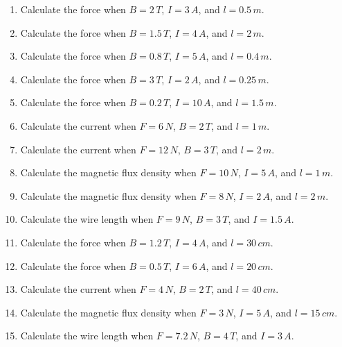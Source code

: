 \documentclass[12pt]{article}
\begin{document}
\begin{enumerate}
    \item Calculate the force when \(B = 2\,T\), \(I = 3\,A\), and \(l = 0.5\,m\).

    \item Calculate the force when \(B = 1.5\,T\), \(I = 4\,A\), and \(l = 2\,m\).

    \item Calculate the force when \(B = 0.8\,T\), \(I = 5\,A\), and \(l = 0.4\,m\).

    \item Calculate the force when \(B = 3\,T\), \(I = 2\,A\), and \(l = 0.25\,m\).

    \item Calculate the force when \(B = 0.2\,T\), \(I = 10\,A\), and \(l = 1.5\,m\).

    \item Calculate the current when \(F = 6\,N\), \(B = 2\,T\), and \(l = 1\,m\).

    \item Calculate the current when \(F = 12\,N\), \(B = 3\,T\), and \(l = 2\,m\).

    \item Calculate the magnetic flux density when \(F = 10\,N\), \(I = 5\,A\), and \(l = 1\,m\).

    \item Calculate the magnetic flux density when \(F = 8\,N\), \(I = 2\,A\), and \(l = 2\,m\).

    \item Calculate the wire length when \(F = 9\,N\), \(B = 3\,T\), and \(I = 1.5\,A\).

    \item Calculate the force when \(B = 1.2\,T\), \(I = 4\,A\), and \(l = 30\,cm\).

    \item Calculate the force when \(B = 0.5\,T\), \(I = 6\,A\), and \(l = 20\,cm\).

    \item Calculate the current when \(F = 4\,N\), \(B = 2\,T\), and \(l = 40\,cm\).

    \item Calculate the magnetic flux density when \(F = 3\,N\), \(I = 5\,A\), and \(l = 15\,cm\).

    \item Calculate the wire length when \(F = 7.2\,N\), \(B = 4\,T\), and \(I = 3\,A\).
\end{enumerate}
\end{document}
